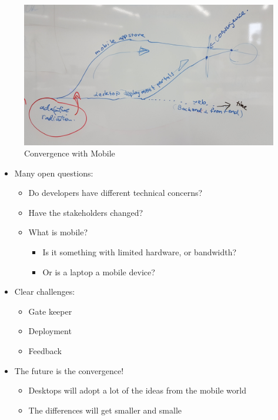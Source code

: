 \documentclass[a4paper]{article}
\begin{document}
\begin{figure}[h]
\centering
\includegraphics[width=0.7\columnwidth]{fig/convergence_with_mobile.jpg}
\caption{Convergence with Mobile}
\end{figure}

\begin{itemize}
\tightlist
\item
  Many open questions:

  \begin{itemize}
  \tightlist
  \item
    Do developers have different technical concerns?
  \item
    Have the stakeholders changed?
  \item
    What is mobile?

    \begin{itemize}
    \tightlist
    \item
      Is it something with limited hardware, or bandwidth?
    \item
      Or is a laptop a mobile device?
    \end{itemize}
  \end{itemize}
\item
  Clear challenges:

  \begin{itemize}
  \tightlist
  \item
    Gate keeper
  \item
    Deployment
  \item
    Feedback
  \end{itemize}
\item
  The future is the convergence!

  \begin{itemize}
  \tightlist
  \item
    Desktops will adopt a lot of the ideas from the mobile world
  \item
    The differences will get smaller and smalle
  \end{itemize}
\end{itemize}
\end{document}
